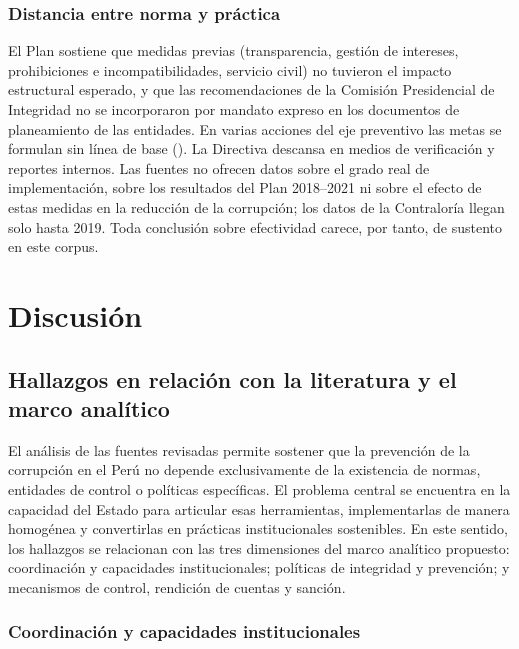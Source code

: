 \documentclass[Afour,sageh,times]{sagej}
\begin{document}
\subsubsection*{Distancia entre norma y práctica}
El Plan sostiene que medidas previas (transparencia, gestión de intereses, prohibiciones e incompatibilidades, servicio civil) no tuvieron el impacto estructural esperado, y que las recomendaciones de la Comisión Presidencial de Integridad no se incorporaron por mandato expreso en los documentos de planeamiento de las entidades. En varias acciones del eje preventivo las metas se formulan sin línea de base (\citealp{pcm2018plan}). La Directiva descansa en medios de verificación y reportes internos. Las fuentes no ofrecen datos sobre el grado real de implementación, sobre los resultados del Plan 2018–2021 ni sobre el efecto de estas medidas en la reducción de la corrupción; los datos de la Contraloría llegan solo hasta 2019. Toda conclusión sobre efectividad carece, por tanto, de sustento en este corpus.

\section{Discusión}
\label{sec:discusion}

\subsection{Hallazgos en relación con la literatura y el marco analítico}
\label{subsec:hallazgos-literatura}

El análisis de las fuentes revisadas permite sostener que la prevención de la corrupción en el Perú no depende exclusivamente de la existencia de normas, entidades de control o políticas específicas. El problema central se encuentra en la capacidad del Estado para articular esas herramientas, implementarlas de manera homogénea y convertirlas en prácticas institucionales sostenibles. En este sentido, los hallazgos se relacionan con las tres dimensiones del marco analítico propuesto: coordinación y capacidades institucionales; políticas de integridad y prevención; y mecanismos de control, rendición de cuentas y sanción.

\subsubsection{Coordinación y capacidades institucionales}
\end{document}
